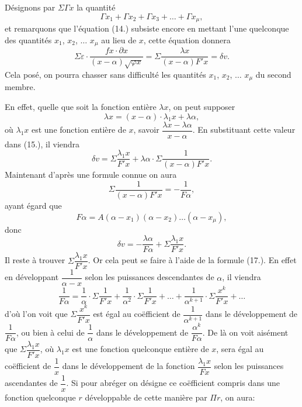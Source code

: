 \documentclass{article}
\begin{document}
Désignons par $\Sigma\Gamma x$ la quantité
\[ \Gamma x_1 + \Gamma x_2 + \Gamma x_3 + \ldots + \Gamma x_\mu, \]
et remarquons que l'équation (14.) subsiste encore en mettant l'une quelconque des quantités $x_1$, $x_2$, $\ldots$ $x_\mu$ au lieu de $x$, cette équation donnera
\[ \Sigma\varepsilon \cdot \frac{fx \cdot \partial x}{(x-\alpha)\sqrt{\varphi x}} = \Sigma\frac{\lambda x}{(x-\alpha)F'x} = \delta v. \tag{15} \]
Cela posé, on pourra chasser sans difficulté les quantités $x_1$, $x_2$, $\ldots$ $x_\mu$ du second membre.

En effet, quelle que soit la fonction entière $\lambda x$, on peut supposer
\[ \lambda x = (x-\alpha) \cdot \lambda_1 x + \lambda\alpha, \]
où $\lambda_1 x$ est une fonction entière de $x$, savoir $\dfrac{\lambda x - \lambda\alpha}{x-\alpha}$. En substituant cette valeur dans (15.), il viendra
\[ \delta v = \Sigma\frac{\lambda_1 x}{F'x} + \lambda\alpha \cdot \Sigma\frac{1}{(x-\alpha)F'x}. \tag{16'} \]
Maintenant d'après une formule connue on aura
\[ \Sigma\frac{1}{(x-\alpha)F'x} = -\frac{1}{F\alpha}, \tag{17} \]
ayant égard que
\[ F\alpha = A(\alpha-x_1)(\alpha-x_2)\ldots(\alpha-x_\mu), \]
donc
\[ \delta v = -\frac{\lambda\alpha}{F\alpha} + \Sigma\frac{\lambda_1 x}{F'x}. \tag{18} \]
Il reste à trouver $\Sigma\dfrac{\lambda_1 x}{F'x}$. Or cela peut se faire à l'aide de la formule (17.). En effet en développant $\dfrac{1}{\alpha-x}$ selon les puissances descendantes de $\alpha$, il viendra
\[ \frac{1}{F\alpha} = \frac{1}{\alpha} \cdot \Sigma\frac{1}{F'x} + \frac{1}{\alpha^{2}} \cdot \Sigma\frac{1}{F'x} + \ldots + \frac{1}{\alpha^{k+1}} \cdot \Sigma\frac{x^{k}}{F'x} + \ldots \tag{19} \]
d'où l'on voit que $\Sigma\dfrac{x^{k}}{F'x}$ est égal au coëfficient de $\dfrac{1}{\alpha^{k+1}}$ dans le développement de $\dfrac{1}{F\alpha}$, ou bien à celui de $\dfrac{1}{\alpha}$ dans le développement de $\dfrac{\alpha^{k}}{F\alpha}$. De là on voit aisément que $\Sigma\dfrac{\lambda_1 x}{F'x}$, où $\lambda_1 x$ est une fonction quelconque entière de $x$, sera égal au coëfficient de $\dfrac{1}{x}$ dans le développement de la fonction $\dfrac{\lambda_1 x}{Fx}$ selon les puissances ascendantes de $\dfrac{1}{x}$. Si pour abréger on désigne ce coëfficient compris dans une fonction quelconque $r$ développable de cette manière par $\Pi r$, on aura:
\end{document}
